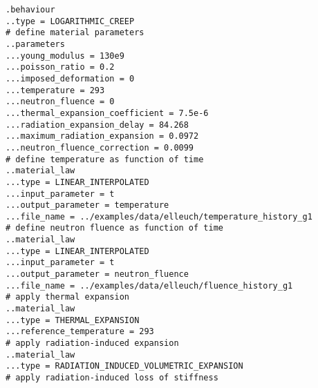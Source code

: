 \documentclass[10pt]{article}
\begin{document}
\noindent \verb+.behaviour+\\
\verb+..type = LOGARITHMIC_CREEP+\\
\verb+# define material parameters+\\
\verb+..parameters+\\
\verb+...young_modulus = 130e9+\\
\verb+...poisson_ratio = 0.2+\\
\verb+...imposed_deformation = 0+\\
\verb+...temperature = 293+\\
\verb+...neutron_fluence = 0+\\
\verb+...thermal_expansion_coefficient = 7.5e-6+\\
\verb+...radiation_expansion_delay = 84.268+\\
\verb+...maximum_radiation_expansion = 0.0972+\\
\verb+...neutron_fluence_correction = 0.0099+\\
\verb+# define temperature as function of time+\\
\verb+..material_law+\\
\verb+...type = LINEAR_INTERPOLATED+\\
\verb+...input_parameter = t+\\
\verb+...output_parameter = temperature+\\
\verb+...file_name = ../examples/data/elleuch/temperature_history_g1+\\
\verb+# define neutron fluence as function of time+\\
\verb+..material_law+\\
\verb+...type = LINEAR_INTERPOLATED+\\
\verb+...input_parameter = t+\\
\verb+...output_parameter = neutron_fluence+\\
\verb+...file_name = ../examples/data/elleuch/fluence_history_g1+\\
\verb+# apply thermal expansion+\\
\verb+..material_law+\\
\verb+...type = THERMAL_EXPANSION+\\
\verb+...reference_temperature = 293+\\
\verb+# apply radiation-induced expansion+\\
\verb+..material_law+\\
\verb+...type = RADIATION_INDUCED_VOLUMETRIC_EXPANSION+\\
\verb+# apply radiation-induced loss of stiffness+\\
\end{document}
